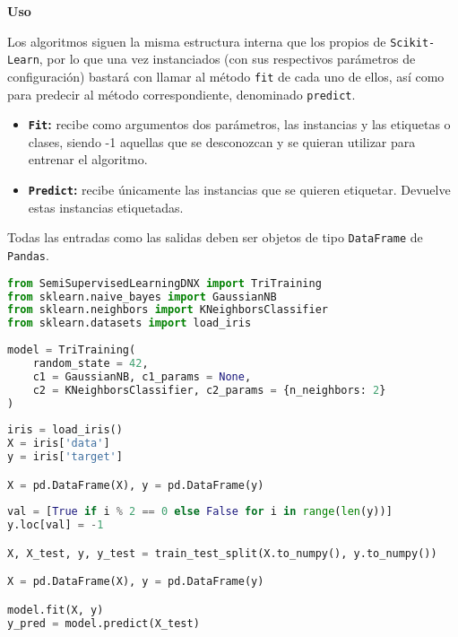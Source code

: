 \textbf{Uso}

Los algoritmos siguen la misma estructura interna que los propios de \texttt{Scikit-Learn}, por lo que una vez instanciados (con sus respectivos parámetros de configuración) bastará con llamar al método \texttt{fit} de cada uno de ellos, así como para predecir al método correspondiente, denominado \texttt{predict}.

\begin{itemize}
\item \textbf{\texttt{Fit}:} recibe como argumentos dos parámetros, las instancias y las etiquetas o clases, siendo -1 aquellas que se desconozcan y se quieran utilizar para entrenar el algoritmo.
\item \textbf{\texttt{Predict}:} recibe únicamente las instancias que se quieren etiquetar. Devuelve estas instancias etiquetadas.
\end{itemize}

Todas las entradas como las salidas deben ser objetos de tipo \texttt{DataFrame} de \texttt{Pandas}.

\begin{lstlisting}[language=Python, caption={Ejemplo de uso de IS-SSL}, label={lst:ejemplossl}]
from SemiSupervisedLearningDNX import TriTraining
from sklearn.naive_bayes import GaussianNB
from sklearn.neighbors import KNeighborsClassifier
from sklearn.datasets import load_iris
	
model = TriTraining(
	random_state = 42,
	c1 = GaussianNB, c1_params = None,
	c2 = KNeighborsClassifier, c2_params = {n_neighbors: 2}
)
	
iris = load_iris()
X = iris['data']
y = iris['target']

X = pd.DataFrame(X), y = pd.DataFrame(y)
	
val = [True if i % 2 == 0 else False for i in range(len(y))]
y.loc[val] = -1

X, X_test, y, y_test = train_test_split(X.to_numpy(), y.to_numpy())

X = pd.DataFrame(X), y = pd.DataFrame(y)

model.fit(X, y)
y_pred = model.predict(X_test)
	
\end{lstlisting}